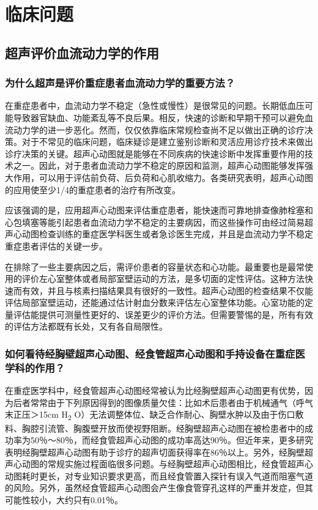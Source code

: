 \section{临床问题}

\subsection{超声评价血流动力学的作用}

\subsubsection{为什么超声是评价重症患者血流动力学的重要方法？}

在重症患者中，血流动力学不稳定（急性或慢性）是很常见的问题。长期低血压可能导致器官缺血、功能紊乱等不良后果。相反，快速的诊断和早期干预可以避免血流动力学的进一步恶化。然而，仅仅依靠临床常规检查尚不足以做出正确的诊疗决策。对于不常见的临床问题，临床疑诊是建立鉴别诊断和灵活应用诊疗技术来做出诊疗决策的关键。超声心动图就是能够在不同疾病的快速诊断中发挥重要作用的技术之一。因此，对于患者血流动力学不稳定的原因和监测，超声心动图能够发挥强大作用，可以用于评估前负荷、后负荷和心肌收缩力。各类研究表明，超声心动图的应用使至少1/4的重症患者的治疗有所改变。

应该强调的是，应用超声心动图来评估重症患者，能快速而可靠地排查像肺栓塞和心包填塞等能引起患者血流动力学不稳定的主要病因，而这些操作可由经过简易超声心动图检查训练的重症医学科医生或者急诊医生完成，并且是血流动力学不稳定重症患者评估的关键一步。

在排除了一些主要病因之后，需评价患者的容量状态和心功能。最重要也是最常使用的评价左心室整体或者局部室壁运动的方法，是多切面的定性评估。这种方法快速而有效，并且与核素扫描结果具有很好的一致性。超声心动图的检查结果不仅能评估局部室壁运动，还能通过估计射血分数来评估左心室整体功能。心室功能的定量评估能提供可测量性更好的、误差更少的评价方法。但需要警惕的是，所有有效的评估方法都既有长处，又有各自局限性。

\subsubsection{如何看待经胸壁超声心动图、经食管超声心动图和手持设备在重症医学科的作用？}

在重症医学科中，经食管超声心动图经常被认为比经胸壁超声心动图更有优势，因为后者常常由于下列原因得到的图像质量欠佳：比如术后患者由于机械通气（呼气末正压＞15cm
H\textsubscript{2}
O）无法调整体位、缺乏合作耐心、胸壁水肿以及由于伤口敷料、胸腔引流管、胸腹壁开放而使视野阻断。经胸壁超声心动图在被检患者中的成功率为50％～80％，而经食管超声心动图的成功率高达90％。但近年来，更多研究表明经胸壁超声心动图有助于诊疗的超声切面获得率在86％以上。另外，经胸壁超声心动图的常规实施过程面临很多问题。与经胸壁超声心动图相比，经食管超声心动图耗时更长，对专业知识要求更高，而且经食管置入探针有误入气道而阻塞气道的风险。另外，虽然经食管超声心动图会产生像食管穿孔这样的严重并发症，但其可能性较小，大约只有0.01％。

